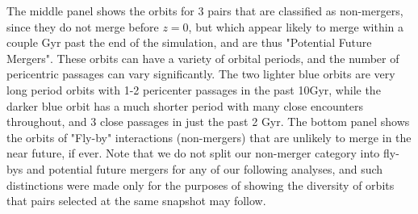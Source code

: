 \documentclass[twocolumn]{aastex631}
\begin{document}
The middle panel shows the orbits for 3 pairs that are classified as non-mergers, since they do not merge before $z=0$, but which appear likely to merge within a couple Gyr past the end of the simulation, and are thus "Potential Future Mergers". 
These orbits can have a variety of orbital periods, and the number of pericentric passages can vary significantly. 
The two lighter blue orbits are very long period orbits with 1-2 pericenter passages in the past 10Gyr, while the darker blue orbit has a much shorter period with many close encounters throughout, and 3 close passages in just the past 2 Gyr.
The bottom panel shows the orbits of "Fly-by" interactions (non-mergers) that are unlikely to merge in the near future, if ever.  
Note that we do not split our non-merger category into fly-bys and potential future mergers for any of our following analyses, and such distinctions were made only for the purposes of showing the diversity of orbits that pairs selected at the same snapshot may follow.
\end{document}
